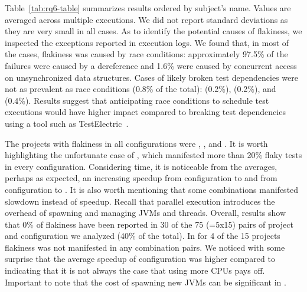 \sloppy Table~\ref{tab:rq6-table} summarizes results ordered by
subject's name.  Values are averaged across multiple executions.  We
did not report standard deviations as they are very small in all
cases.  As to identify the potential causes of flakiness, we inspected
the exceptions reported in execution logs. We found that, in most
of the cases, flakiness was caused by race conditions: approximately
97.5\% of the failures were caused by a  dereference and 1.6\% were
caused by concurrent access on unsynchronized data structures.  Cases of likely
broken test dependencies were not as prevalent as race conditions
(0.8\% of the total):  (0.2\%),
 (0.2\%), and
 (0.4\%). Results suggest that
anticipating race conditions to schedule test executions would have
higher impact compared to breaking test dependencies using a tool such
as TestElectric~\cite{bell-etal-esecfse2015}.

The projects with flakiness
in all configurations were , , and
.  It is worth highlighting the unfortunate case of
, which manifested more than 20\% flaky tests in
every configuration.  Considering time, it is noticeable from the
averages, perhaps as expected, an increasing speedup from
configuration \emph{\SeqClassParMeth} to \emph{\ParClassParMeth} and
from configuration \emph{\ForkSeq} to \emph{\ForkParMeth}.  It is also
worth mentioning that some combinations manifested slowdown instead of
speedup.  Recall that parallel execution introduces the overhead of
spawning and managing JVMs and threads.  Overall, results show that
0\% of flakiness have been reported in 30 of the 75 (=5x15)
pairs of project and configuration we analyzed (40\% of the total).
In for 4 of the 15 projects flakiness was not manifested in 
any combination pairs.  We noticed with some surprise that the average speedup of
configuration \emph{\SeqClassParMeth} was higher compared to
\emph{\ForkParMeth} indicating that it is not always the case that
using more CPUs pays off. Important to note that the cost of spawning
new JVMs can be significant in \emph{\ForkParMeth}.



\begin{center}
\end{center}


